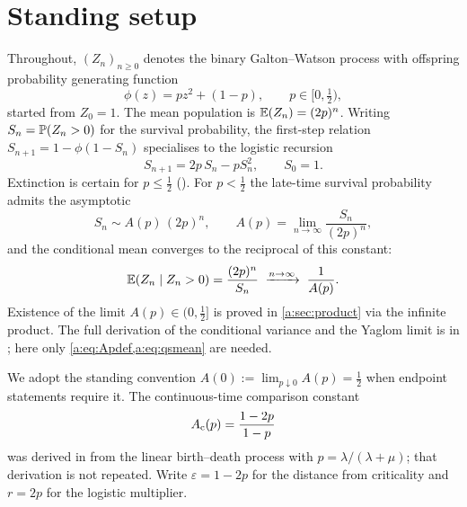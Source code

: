 \section{Standing setup}
\label{a:sec:setup}

Throughout, $(Z_n)_{n\ge0}$ denotes the binary Galton--Watson process with offspring
probability generating function
\begin{equation}
\label{a:eq:pgfbinary}
\phi(z) = p z^2 + (1-p),
\qquad p\in[0,\tfrac12),
\end{equation}
started from $Z_0=1$. The mean population is $\mathbb{E}\!\left(Z_n\right)=(2p)^n$. Writing
$S_n=\mathbb{P}\!\left(Z_n>0\right)$ for the survival probability, the first-step relation
$S_{n+1}=1-\phi(1-S_n)$ specialises to the logistic recursion
\begin{equation}
\label{a:eq:SnIter}
S_{n+1} = 2p\,S_n - p S_n^2,
\qquad S_0=1.
\end{equation}
Extinction is certain for $p\le\tfrac12$ (\ChM). For $p<\tfrac12$ the late-time
survival probability admits the asymptotic
\begin{equation}
\label{a:eq:lateS}
S_n \sim A(p)\,(2p)^n,
\qquad
A(p) = \lim_{n\to\infty}\frac{S_n}{(2p)^n},
\end{equation}
and the conditional mean converges to the reciprocal of this constant:
\begin{equation}
\label{a:eq:qsmean}
\mathbb{E}\!\left(Z_n\mid Z_n>0\right) = \frac{(2p)^n}{S_n}
\;\xrightarrow{n\to\infty}\;
\frac{1}{A(p)} .
\end{equation}
Existence of the limit $A(p)\in(0,\tfrac12]$ is proved in \cref{a:sec:product} via the
infinite product. The full derivation of the conditional variance and the Yaglom limit
is in \ChM; here only \cref{a:eq:Apdef,a:eq:qsmean} are needed.

We adopt the standing convention $A(0):=\lim_{p\downarrow0}A(p)=\tfrac12$ when endpoint
statements require it. The continuous-time comparison constant
\begin{equation}
\label{a:eq:Acts}
A_{\mathrm{c}}(p) = \frac{1-2p}{1-p}
\end{equation}
was derived in \ChM from the linear birth--death process with
$p=\lambda/(\lambda+\mu)$; that derivation is not repeated. Write
$\varepsilon=1-2p$ for the distance from criticality and $r=2p$ for the logistic
multiplier.
